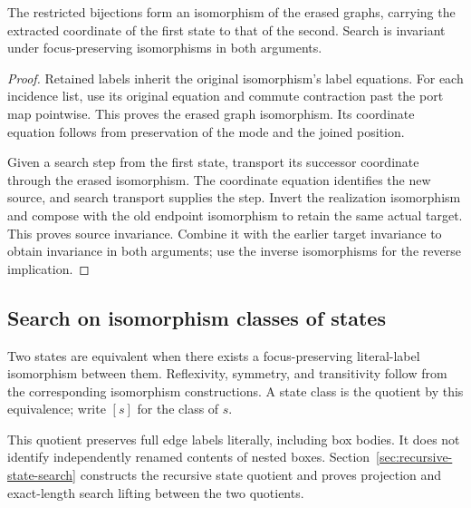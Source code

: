 \begin{theorem}
The restricted bijections form an isomorphism of the erased graphs, carrying
the extracted coordinate of the first state to that of the second. Search
is invariant under focus-preserving isomorphisms in both arguments.
\end{theorem}
\begin{proof}
Retained labels inherit the original isomorphism's label equations. For each
incidence list, use its original equation and commute contraction past the
port map pointwise. This proves the erased graph isomorphism. Its coordinate
equation follows from preservation of the mode and the joined position.

Given a search step from the first state, transport its successor coordinate
through the erased isomorphism. The coordinate equation identifies the new
source, and search transport supplies the step. Invert the realization
isomorphism and compose with the old endpoint isomorphism to retain the same
actual target. This proves source invariance. Combine it with the earlier
target invariance to obtain invariance in both arguments; use the inverse
isomorphisms for the reverse implication.
\end{proof}

\subsection{Search on isomorphism classes of states}
\label{sec:state-quotient}
\begin{definition}
Two states are equivalent when there exists a focus-preserving literal-label
isomorphism between them. Reflexivity, symmetry, and transitivity follow
from the corresponding isomorphism constructions. A state class is the
quotient by this equivalence; write $[s]$ for the class of $s$.
\end{definition}
This quotient preserves full edge labels literally, including box bodies.
It does not identify independently renamed contents of nested boxes.
Section~\ref{sec:recursive-state-search} constructs the recursive state quotient
and proves projection and exact-length search lifting between the two quotients.

